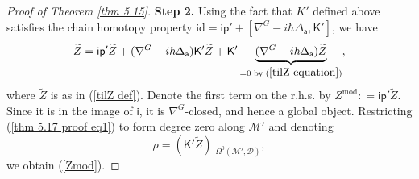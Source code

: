 \documentclass[11pt,a4paper]{amsart}
\theoremstyle{plain} %
\theoremstyle{definition}
\theoremstyle{remark}
\newcommand{\mr}{\mathrm}
\newcommand{\sfa}{\mathsf{a}}
\newcommand{\M}{\mathcal{M}}
\newcommand{\til}{\widetilde}
\newcommand{\mc}{\mathcal}
\newcommand{\ul}{\underline}
\begin{document}
\begin{proof}[Proof of Theorem \ref{thm 5.15}]
\textbf{Step 2.} Using the fact that $K'$ defined above satisfies the chain homotopy property $\mr{id}=\mathsf{i}\mathsf{p}'+[\nabla^G-i\hbar\Delta_\sfa,\mathsf{K}']$, we have
\begin{equation}\label{thm 5.17 proof eq1}
\til{Z}=\mathsf{i}\mathsf{p}'\til{Z}+(\nabla^G-i\hbar\Delta_\sfa) \mathsf{K}' \til{Z}+
   \mathsf{K}'\underbrace{(\nabla^G-i\hbar\Delta_\sfa)\til{Z}}_{=0\mr{\; by\; (\ref{tilZ equation})}} ,
\end{equation}
where $\til{Z}$ is as in (\ref{tilZ def}).
Denote the first term on the r.h.s. by $Z^\mr{mod}\colon= \mathsf{i}\mathsf{p}'\til{Z}$. Since it is in the image of $\mathsf{i}$, it is $\nabla^G$-closed, and hence a global object. Restricting (\ref{thm 5.17 proof eq1}) to form degree zero along $\M'$ and denoting 
\begin{equation}\label{rho from Zmod=ulZ-Delta(rho)}
\rho=(\mathsf{K}' \til{Z})|_{\Omega^0(\M',\mc{D})},
\end{equation}
we obtain (\ref{Zmod}).
\end{proof}
\end{document}
